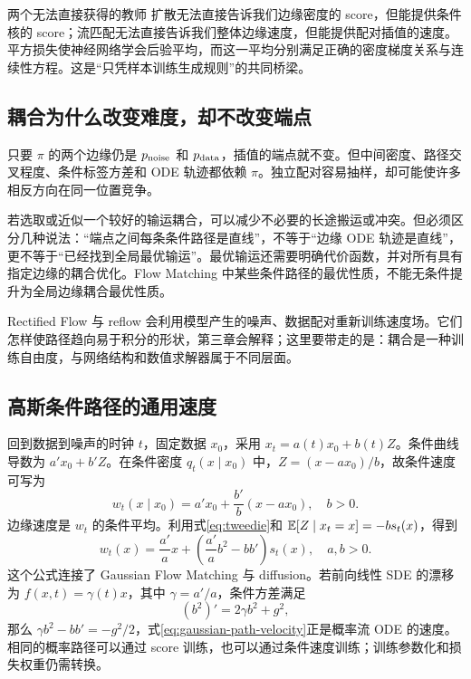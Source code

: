 \begin{intuitionbox}{两个无法直接获得的教师}
扩散无法直接告诉我们边缘密度的 score，但能提供条件核的 score；流匹配无法直接告诉我们整体边缘速度，但能提供配对插值的速度。平方损失使神经网络学会后验平均，而这一平均分别满足正确的密度梯度关系与连续性方程。这是“只凭样本训练生成规则”的共同桥梁。
\end{intuitionbox}

\subsection{耦合为什么改变难度，却不改变端点}
只要 $\pi$ 的两个边缘仍是 $p_{\mathrm{noise}}$ 和 $p_{\mathrm{data}}$，插值的端点就不变。但中间密度、路径交叉程度、条件标签方差和 ODE 轨迹都依赖 $\pi$。独立配对容易抽样，却可能使许多相反方向在同一位置竞争。

若选取或近似一个较好的输运耦合，可以减少不必要的长途搬运或冲突。但必须区分几种说法：“端点之间每条条件路径是直线”，不等于“边缘 ODE 轨迹是直线”，更不等于“已经找到全局最优输运”。最优输运还需要明确代价函数，并对所有具有指定边缘的耦合优化。Flow Matching 中某些条件路径的最优性质，不能无条件提升为全局边缘耦合最优性质。

Rectified Flow 与 reflow 会利用模型产生的噪声、数据配对重新训练速度场。它们怎样使路径趋向易于积分的形状，第三章会解释；这里要带走的是：耦合是一种训练自由度，与网络结构和数值求解器属于不同层面。

\subsection{高斯条件路径的通用速度}
回到数据到噪声的时钟 $t$，固定数据 $x_0$，采用 $x_t=a(t)x_0+b(t)Z$。条件曲线导数为 $a'x_0+b'Z$。在条件密度 $q_t(x\mid x_0)$ 中，$Z=(x-a x_0)/b$，故条件速度可写为
\begin{equation}
 w_t(x\mid x_0)=a'x_0+\frac{b'}b(x-a x_0),\quad b>0.
\end{equation}
边缘速度是 $w_t$ 的条件平均。利用式\eqref{eq:tweedie}和 $\mathbb{E}[Z\mid x_t=x]=-bs_t(x)$，得到
\begin{equation}\boxed{
 w_t(x)=\frac{a'}a x+\left(\frac{a'}a b^2-bb'\right)s_t(x),\quad a,b>0.
 }\label{eq:gaussian-path-velocity}\end{equation}
这个公式连接了 Gaussian Flow Matching 与 diffusion。若前向线性 SDE 的漂移为 $f(x,t)=\gamma(t)x$，其中 $\gamma=a'/a$，条件方差满足
\begin{equation}
 (b^2)'=2\gamma b^2+g^2,
\end{equation}
那么 $\gamma b^2-bb'=-g^2/2$，式\eqref{eq:gaussian-path-velocity}正是概率流 ODE 的速度。相同的概率路径可以通过 score 训练，也可以通过条件速度训练；训练参数化和损失权重仍需转换。

